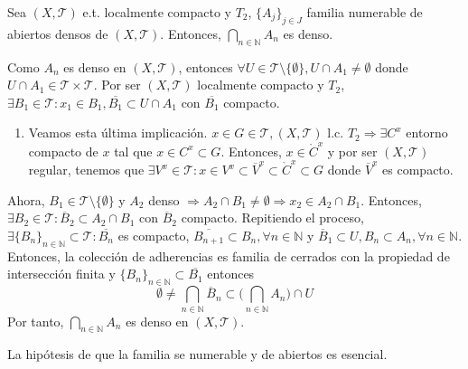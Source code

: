 \begin{theo}[de Baire]
  Sea $( X, \mathcal{T} )$ e.t. localmente compacto y $T_{2}$, $\{ A_{j} \}_{j \in J}$ familia numerable de abiertos densos de $( X, \mathcal{T} )$. Entonces, $\bigcap_{n \in \mathbb{N}} A_{n}$ es denso.
\end{theo}

\begin{dem}
  Como $ A_{n}$ es denso en $( X, \mathcal{T} )$, entonces $\forall U \in \mathcal{T} \setminus \{  \emptyset \}, U \cap A_{1} \neq \emptyset $ donde $U \cap A_{1} \in \mathcal{T} \times \mathcal{T}$. Por ser $( X, \mathcal{T} )$ localmente compacto y $T_{2}$, $\exists B_{1} \in \mathcal{T} : x_{1} \in B_{1}, \overline{B_{1}} \subset U \cap A_{1}$ con $\overline{B_{1}}$ compacto.

  \begin{enumerate}[label=(\roman*)]
    \item [] Veamos esta última implicación. $x \in G \in \mathcal{T}, ( X, \mathcal{T} )$ l.c. $T_{2} \Rightarrow \exists C^{x}$ entorno compacto de $x$ tal que $x \in C^{x} \subset G$. Entonces, $x \in \mathring{C}^{x}$ y por ser $( X, \mathcal{T} )$ regular, tenemos que $\exists V^{x} \in \mathcal{T} : x \in V^{x} \subset \overline{V}^{x} \subset \mathring{C}^{x} \subset G$ donde $\overline{V}^{x}$ es compacto.
  \end{enumerate}

  Ahora, $B_{1} \in \mathcal{T} \setminus \{ \emptyset \}$ y $A_{2}$ denso $\Rightarrow A_{2} \cap B_{1} \neq \emptyset \Rightarrow x_{2} \in A_{2} \cap B_{1}$. Entonces, $\exists B_{2} \in \mathcal{T}: \overline{B}_{2} \subset A_{2} \cap B_{1}$ con $\overline{B}_{2}$ compacto. Repitiendo el proceso, $\exists \{ B_{n} \}_{n \in \mathbb{N}} \subset \mathcal{T} : \overline{B_{n}}$ es compacto, $\overline{B_{n+1}} \subset B_{n}, \forall n \in \mathbb{N}$ y $ \overline{B}_{1} \subset U, B_{n} \subset A_{n}, \forall n \in \mathbb{N}$. Entonces, la colección de adherencias es familia de cerrados con la propiedad de intersección finita y $\{ B_{n} \}_{n \in \mathbb{N}} \subset \overline{B_{1}}$ entonces
  \[
    \emptyset \neq \bigcap_{n \in \mathbb{N}} \overline{B}_{n} \subset \Big ( \bigcap_{n \in \mathbb{N}} A_{n} \Big ) \cap U
  \]
  Por tanto, $\bigcap_{n \in \mathbb{N}} A_{n}$ es denso en $( X, \mathcal{T} )$.
\end{dem}

\begin{obs}
  La hipótesis de que la familia se numerable y de abiertos es esencial.
\end{obs}

